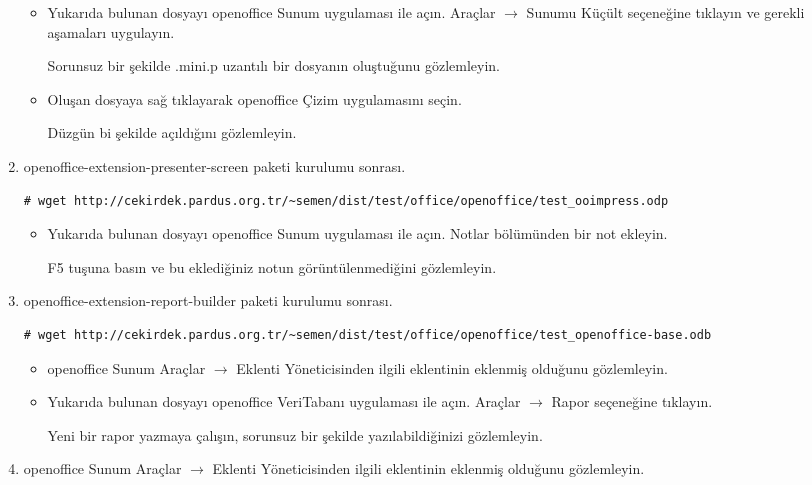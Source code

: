 \documentclass[a4paper,10pt]{article}
\begin{document}
\begin{enumerate}
\begin{itemize}
\item Yukarıda bulunan dosyayı openoffice Sunum uygulaması ile açın. Araçlar  $\rightarrow$  Sunumu Küçült seçeneğine tıklayın ve gerekli aşamaları uygulayın.

Sorunsuz bir şekilde .mini.p uzantılı bir dosyanın oluştuğunu gözlemleyin.

\item Oluşan dosyaya sağ tıklayarak openoffice Çizim uygulamasını seçin.

Düzgün bi şekilde açıldığını gözlemleyin.

\end{itemize}
 
\item openoffice-extension-presenter-screen paketi kurulumu sonrası.
\begin{verbatim}
# wget http://cekirdek.pardus.org.tr/~semen/dist/test/office/openoffice/test_ooimpress.odp
\end{verbatim}

\begin{itemize}


\item Yukarıda bulunan dosyayı openoffice Sunum uygulaması ile açın. Notlar bölümünden bir not ekleyin. 

F5 tuşuna basın ve bu eklediğiniz notun görüntülenmediğini gözlemleyin.

\end{itemize}
\item openoffice-extension-report-builder paketi kurulumu sonrası.
\begin{verbatim}
# wget http://cekirdek.pardus.org.tr/~semen/dist/test/office/openoffice/test_openoffice-base.odb
\end{verbatim}

\begin{itemize}
\item openoffice Sunum Araçlar $\rightarrow$ Eklenti Yöneticisinden ilgili eklentinin eklenmiş olduğunu gözlemleyin.

\item Yukarıda bulunan dosyayı openoffice VeriTabanı uygulaması ile açın. Araçlar $\rightarrow$ Rapor seçeneğine tıklayın.

Yeni bir rapor yazmaya çalışın, sorunsuz bir şekilde yazılabildiğinizi gözlemleyin.

\end{itemize}
\item openoffice Sunum Araçlar $\rightarrow$ Eklenti Yöneticisinden ilgili eklentinin eklenmiş olduğunu gözlemleyin.


\end{enumerate}
\end{document}
